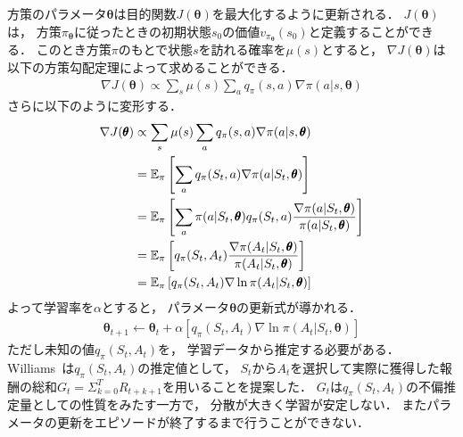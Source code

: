 方策のパラメータ$\pmb{\theta}$は目的関数$J(\pmb{\theta})$を最大化するように更新される．
$J(\pmb{\theta})$は， 方策$\pi_{\pmb{\theta}}$に従ったときの初期状態$s_0$の価値$v_{\pi_{\pmb{\theta}}}(s_0)$と定義することができる．
このとき方策$\pi$のもとで状態$s$を訪れる確率を$\mu(s)$とすると， $\nabla J(\pmb{\theta})$は以下の方策勾配定理によって求めることができる．
\begin{align}
  \label{eq: policy_gradient_theorem}
  \nabla J(\pmb{\theta}) \propto \sum_s \mu(s) \sum_a q_{\pi}(s,a) \nabla \pi(a|s, \pmb{\theta})
\end{align}
さらに以下のように変形する．
\begin{align}
  \nabla J(\pmb{\theta}) &\propto \sum_s \mu(s) \sum_a q_{\pi}(s,a) \nabla \pi(a|s, \pmb{\theta}) \notag \\
  & = \mathbb{E}_{\pi} \left[\sum_a q_\pi(S_t, a) \nabla \pi(a|S_t, \pmb{\theta})\right] \notag \\
  & = \mathbb{E}_{\pi} \left[\sum_a \pi(a|S_t, \pmb{\theta}) q_\pi(S_t, a) \frac{\nabla \pi(a|S_t, \pmb{\theta})}{\pi(a|S_t, \pmb{\theta})}\right] \notag \\
  & = \mathbb{E}_{\pi} \left[q_\pi(S_t,A_t) \frac{\nabla \pi(A_t|S_t, \pmb{\theta})}{\pi(A_t|S_t,\pmb{\theta})}\right] \notag \\
  & = \mathbb{E}_{\pi} \left[q_\pi(S_t,A_t) \nabla \ln \pi(A_t|S_t, \pmb{\theta}) \right] \notag \\
\end{align}
よって学習率を$\alpha$とすると， パラメータ$\pmb{\theta}$の更新式が導かれる．
\begin{align}
  \label{eq:reinforce}
  \pmb{\theta}_{t+1} \leftarrow \pmb{\theta}_{t} + \alpha \left[q_\pi(S_t,A_t) \nabla \ln \pi(A_t|S_t, \pmb{\theta}) \right]
\end{align}
ただし未知の値$q_\pi(S_t,A_t)$を， 学習データから推定する必要がある．
Williams~\cite{Williams:92}は$q_\pi(S_t,A_t)$の推定値として， $S_t$から$A_t$を選択して実際に獲得した報酬の総和$G_t = \Sigma_{k=0}^{T} R_{t+k+1}$を用いることを提案した．
$G_t$は$q_\pi(S_t,A_t)$の不偏推定量としての性質をみたす一方で， 分散が大きく学習が安定しない．
またパラメータの更新をエピソードが終了するまで行うことができない．

